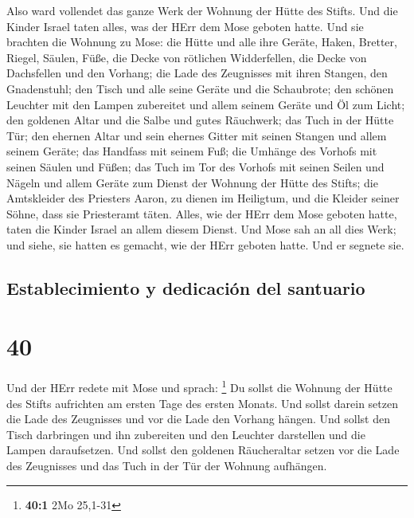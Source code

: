  Also ward vollendet das ganze Werk der Wohnung der Hütte
des Stifts. Und die Kinder Israel taten alles, was der HErr dem Mose
geboten hatte.  Und sie brachten die Wohnung zu Mose: die
Hütte und alle ihre Geräte, Haken, Bretter, Riegel, Säulen, Füße,
 die Decke von rötlichen Widderfellen, die Decke von
Dachsfellen und den Vorhang;  die Lade des Zeugnisses mit
ihren Stangen, den Gnadenstuhl;  den Tisch und alle seine
Geräte und die Schaubrote;  den schönen Leuchter mit den
Lampen zubereitet und allem seinem Geräte und Öl zum Licht;
 den goldenen Altar und die Salbe und gutes Räuchwerk;
das Tuch in der Hütte Tür;  den ehernen Altar und sein
ehernes Gitter mit seinen Stangen und allem seinem Geräte; das Handfass
mit seinem Fuß;  die Umhänge des Vorhofs mit seinen
Säulen und Füßen; das Tuch im Tor des Vorhofs mit seinen Seilen und
Nägeln und allem Geräte zum Dienst der Wohnung der Hütte des Stifts;
 die Amtskleider des Priesters Aaron, zu dienen im
Heiligtum, und die Kleider seiner Söhne, dass sie Priesteramt täten.
 Alles, wie der HErr dem Mose geboten hatte, taten die
Kinder Israel an allem diesem Dienst.  Und Mose sah an
all dies Werk; und siehe, sie hatten es gemacht, wie der HErr geboten
hatte. Und er segnete sie.

\hypertarget{establecimiento-y-dedicaciuxf3n-del-santuario}{%
\subsection{Establecimiento y dedicación del
santuario}\label{establecimiento-y-dedicaciuxf3n-del-santuario}}

\hypertarget{section-39}{%
\section{40}\label{section-39}}

 Und der HErr redete mit Mose und sprach: \footnote{\textbf{40:1}
  2Mo 25,1-31}  Du sollst die Wohnung der Hütte des Stifts
aufrichten am ersten Tage des ersten Monats.  Und sollst
darein setzen die Lade des Zeugnisses und vor die Lade den Vorhang
hängen.  Und sollst den Tisch darbringen und ihn
zubereiten und den Leuchter darstellen und die Lampen daraufsetzen.
 Und sollst den goldenen Räucheraltar setzen vor die Lade
des Zeugnisses und das Tuch in der Tür der Wohnung aufhängen.

